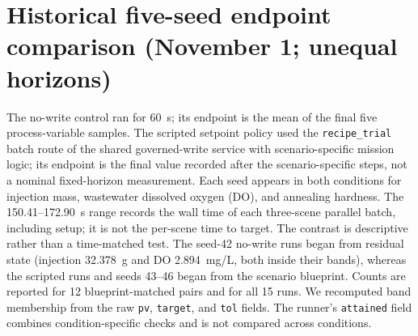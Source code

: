 \documentclass[10pt]{article}
\begin{document}
\section*{Historical five-seed endpoint comparison (November 1; unequal horizons)}
The no-write control ran for 60~s; its endpoint is the mean of the final five process-variable samples. The scripted setpoint policy used the \texttt{recipe\_trial} batch route of the shared governed-write service with scenario-specific mission logic; its endpoint is the final value recorded after the scenario-specific steps, not a nominal fixed-horizon measurement. Each seed appears in both conditions for injection mass, wastewater dissolved oxygen (DO), and annealing hardness. The 150.41--172.90~s range records the wall time of each three-scene parallel batch, including setup; it is not the per-scene time to target. The contrast is descriptive rather than a time-matched test. The seed-42 no-write runs began from residual state (injection 32.378~g and DO 2.894~mg/L, both inside their bands), whereas the scripted runs and seeds 43--46 began from the scenario blueprint. Counts are reported for 12 blueprint-matched pairs and for all 15 runs. We recomputed band membership from the raw \texttt{pv}, \texttt{target}, and \texttt{tol} fields. The runner's \texttt{attained} field combines condition-specific checks and is not compared across conditions.
\end{document}

